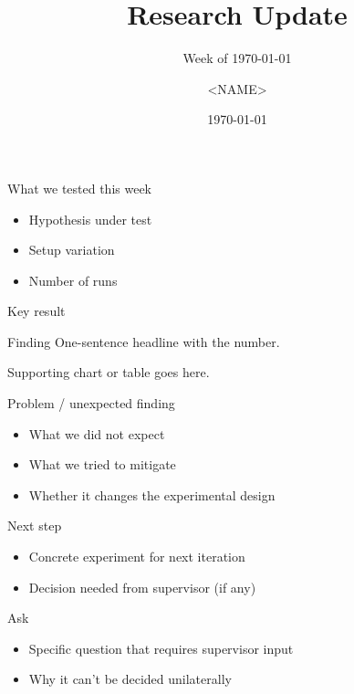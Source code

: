 \documentclass[aspectratio=169,12pt]{beamer}
\title{Research Update}
\subtitle{Week of \today}
\author{<NAME>}
\institute{<INSTITUTE>}
\date{\today}
\begin{document}
\begin{frame}[plain]
  \titlepage
\end{frame}

\begin{frame}{What we tested this week}
  \begin{itemize}
    \item Hypothesis under test
    \item Setup variation
    \item Number of runs
  \end{itemize}
\end{frame}

\begin{frame}{Key result}
  \begin{block}{Finding}
    One-sentence headline with the number.
  \end{block}
  Supporting chart or table goes here.
\end{frame}

\begin{frame}{Problem / unexpected finding}
  \begin{itemize}
    \item What we did not expect
    \item What we tried to mitigate
    \item Whether it changes the experimental design
  \end{itemize}
\end{frame}

\begin{frame}{Next step}
  \begin{itemize}
    \item Concrete experiment for next iteration
    \item Decision needed from supervisor (if any)
  \end{itemize}
\end{frame}

\begin{frame}{Ask}
  \begin{itemize}
    \item Specific question that requires supervisor input
    \item Why it can't be decided unilaterally
  \end{itemize}
\end{frame}
\end{document}
